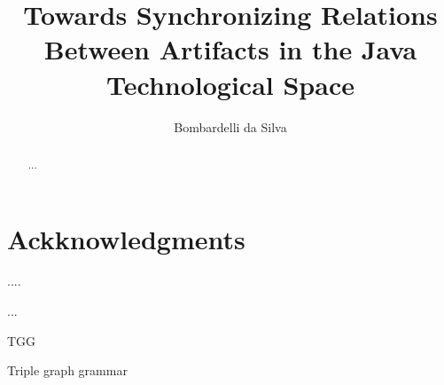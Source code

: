 \documentclass[tuberlin,cic,tc,english,noabntcite]{iiufrgs}
\title{Towards Synchronizing Relations Between Artifacts in the Java Technological Space}
\author{Bombardelli da Silva}{William}
\begin{document}
\maketitle


\chapter*{Ackknowledgments}
....



\begin{abstract}
    ...
\end{abstract}

\begin{englishabstract}
	...
\end{englishabstract}

\listoffigures


\begin{listofabbrv}{TGG}
    \item[TGG] Triple graph grammar
\end{listofabbrv}

\end{document}
